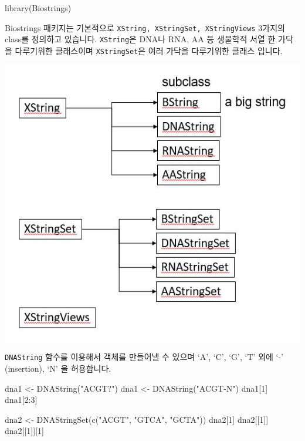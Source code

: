 \documentclass[
  a4paper,
]{book}
\newenvironment{Shaded}{\begin{snugshade}}{\end{snugshade}}
\newcommand{\DecValTok}[1]{\textcolor[rgb]{0.68,0.00,0.00}{#1}}
\newcommand{\FunctionTok}[1]{\textcolor[rgb]{0.28,0.35,0.67}{#1}}
\newcommand{\NormalTok}[1]{\textcolor[rgb]{0.00,0.23,0.31}{#1}}
\newcommand{\OtherTok}[1]{\textcolor[rgb]{0.00,0.23,0.31}{#1}}
\newcommand{\SpecialCharTok}[1]{\textcolor[rgb]{0.37,0.37,0.37}{#1}}
\newcommand{\StringTok}[1]{\textcolor[rgb]{0.13,0.47,0.30}{#1}}
\begin{document}
\begin{Shaded}
\begin{Highlighting}[]
\FunctionTok{library}\NormalTok{(Biostrings)}
\end{Highlighting}
\end{Shaded}

Biostrings 패키지는 기본적으로
\texttt{XString,\ XStringSet,\ XStringViews} 3가지의 class를 정의하고
있습니다. \texttt{XString}은 DNA나 RNA, AA 등 생물학적 서열 한 가닥을
다루기위한 클래스이며 \texttt{XStringSet}은 여러 가닥을 다루기위한
클래스 입니다.

\includegraphics{images/04/biostrings.JPG}

\texttt{DNAString} 함수를 이용해서 객체를 만들어낼 수 있으며 `A', `C',
`G', `T' 외에 `-' (insertion), `N' 을 허용합니다.

\begin{Shaded}
\begin{Highlighting}[]
\NormalTok{dna1 }\OtherTok{\textless{}{-}} \FunctionTok{DNAString}\NormalTok{(}\StringTok{"ACGT?"}\NormalTok{)}
\NormalTok{dna1 }\OtherTok{\textless{}{-}} \FunctionTok{DNAString}\NormalTok{(}\StringTok{"ACGT{-}N"}\NormalTok{)}
\NormalTok{dna1[}\DecValTok{1}\NormalTok{]}
\NormalTok{dna1[}\DecValTok{2}\SpecialCharTok{:}\DecValTok{3}\NormalTok{]}

\NormalTok{dna2 }\OtherTok{\textless{}{-}} \FunctionTok{DNAStringSet}\NormalTok{(}\FunctionTok{c}\NormalTok{(}\StringTok{"ACGT"}\NormalTok{, }\StringTok{"GTCA"}\NormalTok{, }\StringTok{"GCTA"}\NormalTok{))}
\NormalTok{dna2[}\DecValTok{1}\NormalTok{]}
\NormalTok{dna2[[}\DecValTok{1}\NormalTok{]]}
\NormalTok{dna2[[}\DecValTok{1}\NormalTok{]][}\DecValTok{1}\NormalTok{]}
\end{Highlighting}
\end{Shaded}
\end{document}

